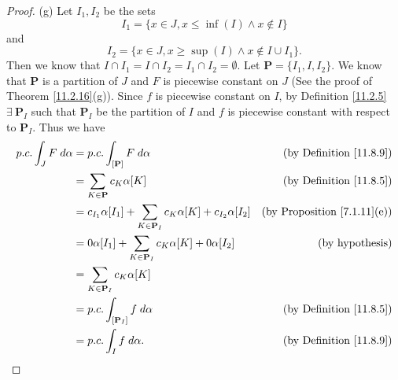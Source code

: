 \begin{proof}{(g)}
    Let \(I_1, I_2\) be the sets
    \[
        I_1 = \{x \in J, x \leq \inf(I) \land x \notin I\}
    \]
    and
    \[
        I_2 = \{x \in J, x \geq \sup(I) \land x \notin I \cup I_1\}.
    \]
    Then we know that \(I \cap I_1 = I \cap I_2 = I_1 \cap I_2 = \emptyset\).
    Let \(\mathbf{P} = \{I_1, I, I_2\}\).
    We know that \(\mathbf{P}\) is a partition of \(J\) and \(F\) is piecewise constant on \(J\)
    (See the proof of Theorem \ref{11.2.16}(g)).
    Since \(f\) is piecewise constant on \(I\), by Definition \ref{11.2.5} \(\exists\ \mathbf{P}_I\) such that \(\mathbf{P}_I\) be the partition of \(I\) and \(f\) is piecewise constant with respect to \(\mathbf{P}_I\).
    Thus we have
    \begin{align*}
        p.c. \int_J F \; d \alpha & = p.c. \int_{[\mathbf{P}]} F \; d \alpha                                              & \text{(by Definition \ref{11.8.9})}     \\
                                  & = \sum_{K \in \mathbf{P}} c_K \alpha[K]                                               & \text{(by Definition \ref{11.8.5})}     \\
                                  & = c_{I_1} \alpha[I_1] + \sum_{K \in \mathbf{P}_I} c_K \alpha[K] + c_{I_2} \alpha[I_2] & \text{(by Proposition \ref{7.1.11}(e))} \\
                                  & = 0 \alpha[I_1] + \sum_{K \in \mathbf{P}_I} c_K \alpha[K] + 0 \alpha[I_2]             & \text{(by hypothesis)}                  \\
                                  & = \sum_{K \in \mathbf{P}_I} c_K \alpha[K]                                                                                       \\
                                  & = p.c. \int_{[\mathbf{P}_I]} f \; d \alpha                                            & \text{(by Definition \ref{11.8.5})}     \\
                                  & = p.c. \int_I f \; d \alpha.                                                          & \text{(by Definition \ref{11.8.9})}
    \end{align*}
\end{proof}

